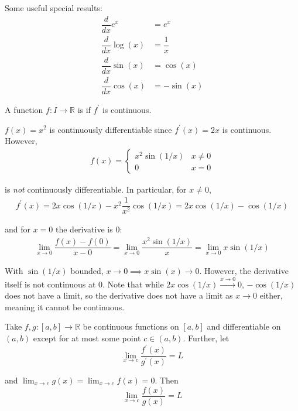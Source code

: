 \documentclass{article}
\begin{document}
Some useful special results:
\begin{align*}
  \dfrac{d}{dx} e^x & = e^x  \\
  \dfrac{d}{dx} \log(x) & = \dfrac{1}{x} \\
  \dfrac{d}{dx} \sin(x) & = \cos(x) \\
  \dfrac{d}{dx} \cos(x) & = -\sin(x)
\end{align*}

\begin{definition}
  A function $f: I \to \mathbb{R}$ is  if $f^\prime$ is continuous.
\end{definition}

\begin{example}
  $f(x) = x^2$ is continuously differentiable since $f^\prime(x) = 2x$ is continuous. However,
  \begin{align*}
    f(x) = \begin{cases}
      x^2 \sin(1/x) & x \ne 0 \\
      0 & x = 0
    \end{cases}
  \end{align*}

  is \textit{not} continuously differentiable. In particular, for $x \ne 0$,
  \begin{align*}
    f^\prime(x)
    =
    2 x \cos(1/x) - x^2 \dfrac{1}{x^2} \cos(1/x)
    =
    2 x \cos(1/x) - \cos(1/x)
  \end{align*}

  and for $x = 0$ the derivative is $0$:
  \begin{align*}
    \lim_{x \to 0}
    \dfrac{f(x) - f(0)}{x - 0}
    =
    \lim_{x \to 0}
    \dfrac{x^2 \sin(1/x)}{x}
    =
    \lim_{x \to 0}
    x \sin(1/x)
  \end{align*}

  With $\sin(1/x)$ bounded, $x \to 0 \implies x \sin(x) \to 0$. However, the derivative itself is not continuous  at $0$. Note that while $2x \cos(1/x) \xrightarrow{x \to 0} 0$, $- \cos(1/x)$ does not have a limit, so the derivative does not have a limit as $x \to 0$ either, meaning it cannot be continuous.
\end{example}

\begin{theorem}\label{thm:lecture4_lhopital}
  Take $f, g: [a, b] \to \mathbb{R}$ be continuous functions on $[a, b]$ and differentiable on $(a, b)$ except for at most some point $c \in (a, b)$. Further, let
  \[
    \lim_{x \to c} \dfrac{f^\prime(x)}{g^\prime(x)} = L
  \]

  and $\lim_{x \to c} g(x) = \lim_{x \to c} f(x) = 0$. Then
  \[
    \lim_{x \to c} \dfrac{f(x)}{g(x)} = L
  \]
\end{theorem}
\end{document}
